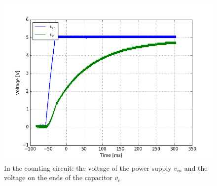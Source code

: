 \begin{figure}[H]
\centering
\includegraphics[width=.7\textwidth]{11/start_count.png}
\caption{In the counting circuit: the voltage of the power supply $v_{in}$ and the voltage on the ends of the capacitor $v_c$}\label{start_count}
\end{figure}
